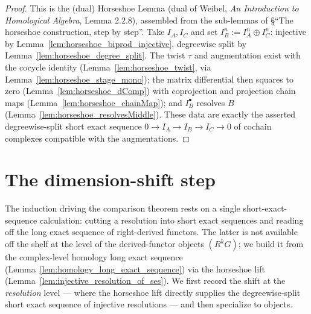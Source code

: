 \begin{proof}
  \leanok
  This is the (dual) Horseshoe Lemma (dual of Weibel, \emph{An Introduction to
  Homological Algebra}, Lemma 2.2.8), assembled from the sub-lemmas of \S``The horseshoe
  construction, step by step''. Take \(I_A, I_C\) and set \(I_B^n := I_A^n \oplus I_C^n\):
  injective by Lemma~\ref{lem:horseshoe_biprod_injective}, degreewise split by
  Lemma~\ref{lem:horseshoe_degree_split}. The twist \(\tau\) and augmentation exist with
  the cocycle identity (Lemma~\ref{lem:horseshoe_twist}, via
  Lemma~\ref{lem:horseshoe_stage_mono}); the matrix differential then squares to zero
  (Lemma~\ref{lem:horseshoe_dComp}) with coprojection and projection chain maps
  (Lemma~\ref{lem:horseshoe_chainMap}); and \(I_B^\bullet\) resolves \(B\)
  (Lemma~\ref{lem:horseshoe_resolvesMiddle}). These data are exactly the asserted
  degreewise-split short exact sequence \(0 \to I_A \to I_B \to I_C \to 0\) of cochain
  complexes compatible with the augmentations.
\end{proof}

\section{The dimension-shift step}

The induction driving the comparison theorem rests on a single short-exact-sequence
calculation: cutting a resolution into short exact sequences and reading off the
long exact sequence of right-derived functors. The latter is not available off the
shelf at the level of the derived-functor objects \((R^k G)\); we build it from the
complex-level homology long exact sequence
(Lemma~\ref{lem:homology_long_exact_sequence}) via the horseshoe lift
(Lemma~\ref{lem:injective_resolution_of_ses}). We first record the shift at the
\emph{resolution} level — where the horseshoe lift directly supplies the
degreewise-split short exact sequence of injective resolutions — and then specialize
to objects.

